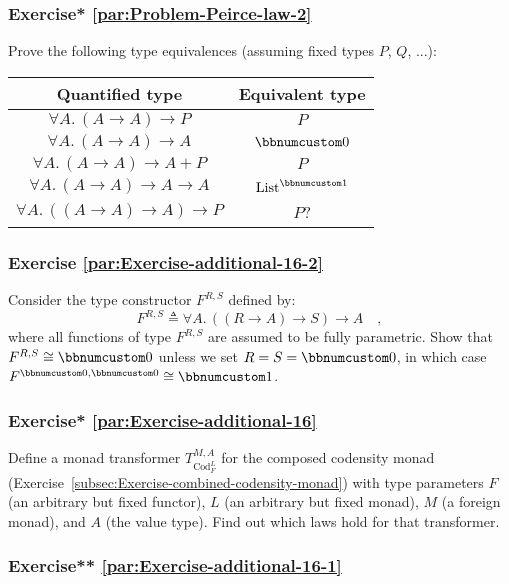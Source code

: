 \subsubsection{Exercise{*} \label{par:Problem-Peirce-law-2}\ref{par:Problem-Peirce-law-2}}

Prove the following type equivalences (assuming fixed types $P$,
$Q$, ...):

\begin{tabular}{|c|c|}
\hline 
\textbf{\footnotesize{}Quantified type} & \textbf{\footnotesize{}Equivalent type}\tabularnewline
\hline 
\hline 
$\forall A.\,(A\rightarrow A)\rightarrow P$ & $P$\tabularnewline
\hline 
$\forall A.\,(A\rightarrow A)\rightarrow A$ & $\bbnum 0$\tabularnewline
\hline 
$\forall A.\,(A\rightarrow A)\rightarrow A+P$ & $P$\tabularnewline
\hline 
$\forall A.\,(A\rightarrow A)\rightarrow A\rightarrow A$ & $\text{List}^{\bbnum 1}$\tabularnewline
\hline 
$\forall A.\,((A\rightarrow A)\rightarrow A)\rightarrow P$ & $P$?\tabularnewline
\hline 
\end{tabular}

\subsubsection{Exercise \label{par:Exercise-additional-16-2}\ref{par:Exercise-additional-16-2}}

Consider the type constructor $F^{R,S}$ defined by:
\[
F^{R,S}\triangleq\forall A.\,((R\rightarrow A)\rightarrow S)\rightarrow A\quad,
\]
where all functions of type $F^{R,S}$ are assumed to be fully parametric.
Show that $F^{R,S}\cong\bbnum 0$ unless we set $R=S=\bbnum 0$, in
which case $F^{\bbnum 0,\bbnum 0}\cong\bbnum 1$. 

\subsubsection{Exercise{*} \label{par:Exercise-additional-16}\ref{par:Exercise-additional-16}}

Define a monad transformer $T_{\text{Cod}_{F}^{L}}^{M,A}$ for the
composed codensity monad (Exercise~\ref{subsec:Exercise-combined-codensity-monad})
with type parameters $F$ (an arbitrary but fixed functor), $L$ (an
arbitrary but fixed monad), $M$ (a foreign monad), and $A$ (the
value type). Find out which laws hold for that transformer.

\subsubsection{Exercise{*}{*} \label{par:Exercise-additional-16-1}\ref{par:Exercise-additional-16-1}}


